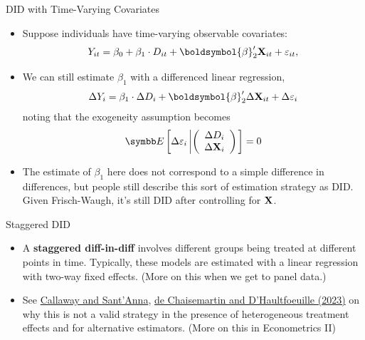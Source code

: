 \documentclass[aspectratio=169,11pt]{beamer}
\begin{document}
\begin{frame}{DID with Time-Varying Covariates}
\begin{itemize}
  \item Suppose individuals have time-varying observable covariates:
  \begin{align*}
  Y_{it}=\beta_{0}+\beta_{1}\cdot D_{it}+\boldsymbol{\beta}_2' {\bf X}_{it} + \varepsilon_{it},
  \end{align*}

  \item We can still estimate $\beta_{1}$ with a differenced linear regression,
  \begin{align*}
  \Delta Y_{i}=\beta_{1} \cdot \Delta D_{i}+\boldsymbol{\beta}_2' \Delta {\bf X}_{it} + \Delta \varepsilon_{i}
  \end{align*}
  noting that the exogeneity assumption becomes
  \begin{align*}
\E\left[\Delta\varepsilon_{i}\left|\left(\begin{array}{c}
\Delta D_{i}\\
\Delta\mathbf{X}_{i}
\end{array}\right)\right.\right]=0
\end{align*}

  \item The estimate of $\beta_{1}$ here does not correspond to a simple
  difference in differences,
  but people still describe this sort of estimation strategy as DID.
  Given Frisch-Waugh, it's still DID after controlling for ${\bf X}$.


\end{itemize}
\end{frame}

\begin{frame}{Staggered DID}
\begin{itemize}
  \item A {\bf staggered diff-in-diff} involves different groups being
    treated at different points in time. Typically, these models are
    estimated with a linear regression with two-way fixed effects. (More
    on this when we get to panel data.) 

  \medskip
  \item See \href{https://www.sciencedirect.com/science/article/pii/S0304407620303948}{Callaway and Sant'Anna}, 
    \href{https://academic.oup.com/ectj/article/26/3/C1/6604378}{de Chaisemartin and D'Haultfoeuille (2023)}
    on why this is not a valid strategy in the presence of heterogeneous
    treatment effects and for alternative estimators. (More on this in Econometrics II)

\end{itemize}
\end{frame}
\end{document}
